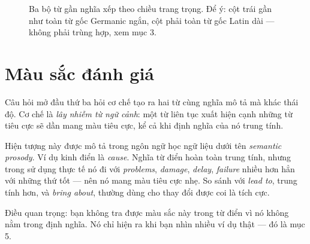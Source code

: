 \documentclass[../../english.tex]{subfiles}
\begin{document}
\begin{figure}[H]\centering
{}
\caption{Ba bộ từ gần nghĩa xếp theo chiều trang trọng. Để ý: cột trái gần như toàn từ gốc Germanic ngắn, cột phải toàn từ gốc Latin dài --- không phải trùng hợp, xem mục 3.}
\label{fig:van-vuc-thang}
\end{figure}

\section{Màu sắc đánh giá}

Câu hỏi mở đầu thứ ba hỏi cơ chế tạo ra hai từ cùng nghĩa mô tả mà khác thái độ. Cơ chế là \emph{lây nhiễm từ ngữ cảnh}: một từ liên tục xuất hiện cạnh những từ tiêu cực sẽ dần mang màu tiêu cực, kể cả khi định nghĩa của nó trung tính.

Hiện tượng này được mô tả trong ngôn ngữ học ngữ liệu dưới tên \emph{semantic prosody}\cite{louw1993}. Ví dụ kinh điển là \emph{cause}. Nghĩa từ điển hoàn toàn trung tính, nhưng trong sử dụng thực tế nó đi với \emph{problems}, \emph{damage}, \emph{delay}, \emph{failure} nhiều hơn hẳn với những thứ tốt --- nên nó mang màu tiêu cực nhẹ. So sánh với \emph{lead to}, trung tính hơn, và \emph{bring about}, thường dùng cho thay đổi được coi là tích cực.

Điều quan trọng: bạn không tra được màu sắc này trong từ điển vì nó không nằm trong định nghĩa. Nó chỉ hiện ra khi bạn nhìn nhiều ví dụ thật --- đó là mục 5.
\end{document}
